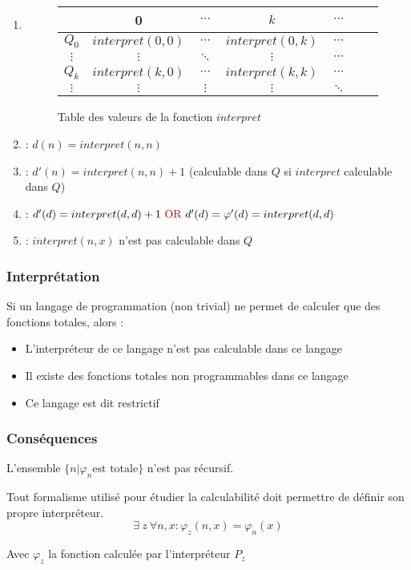 \begin{enumerate}
\item {}
	\begin{figure}[H]
    		\centering
    		\begin{tabular}{c|cccccc}
		 & 0 & $\cdots$ & $k$ & $\cdots$ \\ 
		\hline 
		$Q_0$ & $interpret(0,0)$ & $\cdots$ & $interpret(0,k)$ & $\cdots$ \\
		$\vdots$ & $\vdots$ & $\ddots$ & $\vdots$ & $\cdots$ \\ 
		$Q_k$ & $interpret(k,0)$ & $\cdots$ & $interpret(k,k)$ & $\cdots$ \\ 
		$\vdots$ & $\vdots$ & $\vdots$ & $\vdots$ & $\ddots$ \\ 
		\end{tabular}
		\caption{Table des valeurs de la fonction $interpret$}
	\end{figure}
\item {} : $d(n) = interpret(n,n)$
\item {} : $d'(n)= interpret(n,n) + 1$ (calculable dans $Q$ si $interpret$ calculable dans $Q$)
\item {} : $d'(d)= interpret(d,d) + 1 \text{ \red{OR} } d'(d) = \varphi'(d) = interpret(d,d)$
\item {} : $interpret(n, x)$ n'est pas calculable dans $Q$
\end{enumerate}

\subsubsection{Interprétation}

Si un langage de programmation (non trivial) ne permet de calculer que des fonctions totales, alors :
\begin{itemize}
\item L'interpréteur de ce langage n'est pas calculable dans ce langage
\item Il existe des fonctions totales non programmables dans ce langage
\item Ce langage est dit restrictif
\end{itemize}

\subsubsection{Conséquences}

L'ensemble $\{n | \varphi_n \text{est totale} \}$ n'est pas récursif.
\begin{formal}
Tout formalisme utilisé pour étudier la calculabilité doit permettre de définir son propre interpréteur.
\begin{equation*}
\exists \ z \ \forall n, x : \varphi_z(n, x) = \varphi_n (x)
\end{equation*}
\begin{flushright}
Avec $\varphi_z$ la fonction calculée par l'interpréteur $P_z$
\end{flushright}
\end{formal}

